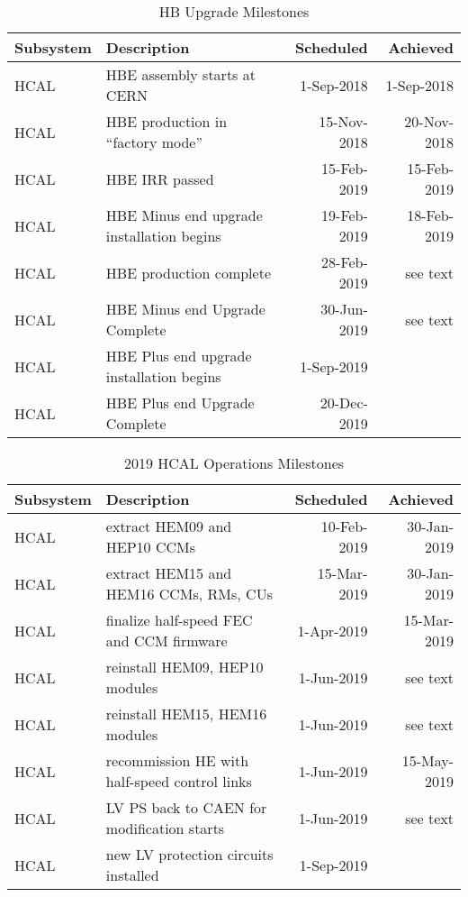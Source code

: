 \documentclass[12pt]{article}
\begin{document}
\begin{table}[htp]
\caption{HB Upgrade Milestones}
\begin{center}
\begin{tabular}{|l|l|r|r|}
\hline
Subsystem&Description&Scheduled&Achieved\\
\hline
HCAL & HBE assembly starts at CERN & 1-Sep-2018 &  1-Sep-2018  \\
\hline
HCAL & HBE production in ``factory mode'' & 15-Nov-2018 &  20-Nov-2018  \\
\hline
HCAL& HBE IRR passed & 15-Feb-2019 &  15-Feb-2019 \\
\hline
HCAL& HBE Minus end upgrade installation begins & 19-Feb-2019 & 18-Feb-2019 \\
\hline
HCAL & HBE production complete & 28-Feb-2019 & see text  \\
\hline
HCAL& HBE Minus end Upgrade Complete & 30-Jun-2019  & see text   \\
\hline
HCAL& HBE Plus end upgrade installation begins & 1-Sep-2019  &  \\
\hline
HCAL& HBE Plus end Upgrade Complete & 20-Dec-2019   &   \\
\hline
\end{tabular}
\end{center}
\label{HB Upgrade Milestones}
\end{table}%

\begin{table}[htp]
\caption{2019 HCAL Operations Milestones}
\begin{center}
\begin{tabular}{|l|l|r|r|}
\hline
Subsystem&Description&Scheduled&Achieved\\
\hline
HCAL & extract HEM09 and HEP10 CCMs  & 10-Feb-2019 &  30-Jan-2019  \\
\hline
HCAL & extract HEM15 and HEM16 CCMs, RMs, CUs & 15-Mar-2019 &  30-Jan-2019  \\
\hline
HCAL&  finalize half-speed FEC and CCM firmware  & 1-Apr-2019 & 15-Mar-2019 \\
\hline
HCAL& reinstall HEM09, HEP10 modules & 1-Jun-2019 &  see text  \\
\hline
HCAL& reinstall HEM15, HEM16 modules & 1-Jun-2019 &  see text  \\
\hline
HCAL & recommission HE with half-speed control links & 1-Jun-2019 &  15-May-2019  \\
\hline
HCAL& LV PS back to CAEN for modification starts & 1-Jun-2019  & see text  \\
\hline
HCAL& new LV protection circuits installed & 1-Sep-2019  &  \\
\hline
\end{tabular}
\end{center}
\label{2019 HCAL Operations Milestones}
\end{table}%
\end{document}
